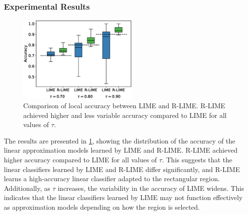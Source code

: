 \documentclass[11pt]{article}
\begin{document}
\subsubsection{Experimental Results}
\begin{figure}[tbp]
  \centering
  \includegraphics[width=0.53\textwidth]{experiments/exp2/box_plot}
  \caption[Comparison of Local Accuracy between R-LIME and LIME]{%
    Comparison of local accuracy between LIME and R-LIME\@.
    R-LIME achieved higher and less variable accuracy compared to LIME
    for all values of $\tau$.
  }\label{fig:box_plot}
\end{figure}
The results are presented in \cref{fig:box_plot},
showing the distribution of the accuracy of the linear approximation models
learned by LIME and R-LIME\@.
R-LIME achieved higher accuracy compared to LIME for all values of $\tau$.
This suggests that the linear classifiers learned by LIME and R-LIME
differ significantly,
and R-LIME learns a high-accuracy linear classifier adapted to the rectangular region.
Additionally, as $\tau$ increases,
the variability in the accuracy of LIME widens.
This indicates that the linear classifiers learned by LIME may not function
effectively as approximation models depending on how the region is selected.
\end{document}
